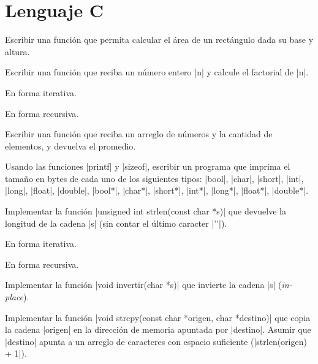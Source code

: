 \chapter{Lenguaje C}

\begin{ejercicio}
Escribir una función que permita calcular el área de un rectángulo dada
su base y altura.
\end{ejercicio}

\begin{ejercicio}
Escribir una función que reciba un número entero |n| y calcule el factorial de
|n|.
\begin{partes}
    \item En forma iterativa.
    \item En forma recursiva.
\end{partes}
\end{ejercicio}

\begin{ejercicio}
Escribir una función que reciba un arreglo de números y la cantidad de
elementos, y devuelva el promedio.
\end{ejercicio}

\begin{ejercicio}
    Usando las funciones |printf| y |sizeof|, escribir un programa que imprima
    el tamaño en bytes de cada uno de los siguientes tipos: |bool|, |char|,
    |short|, |int|, |long|, |float|, |double|, |bool*|, |char*|,
    |short*|, |int*|, |long*|, |float*|, |double*|.
\end{ejercicio}

\begin{ejercicio}
Implementar la función |unsigned int strlen(const char *s)| que devuelve la
longitud de la cadena |s| (sin contar el último caracter |'\0'|).
\begin{partes}
    \item En forma iterativa.
    \item En forma recursiva.
\end{partes}
\end{ejercicio}

\begin{ejercicio}
Implementar la función |void invertir(char *s)| que invierte la cadena
|s| ({\it in-place}).
\end{ejercicio}

\begin{ejercicio}
Implementar la función |void strcpy(const char *origen, char *destino)| que
copia la cadena |origen| en la dirección de memoria apuntada por |destino|.
Asumir que |destino| apunta a un arreglo de caracteres con espacio suficiente
(|strlen(origen) + 1|).
\end{ejercicio}


